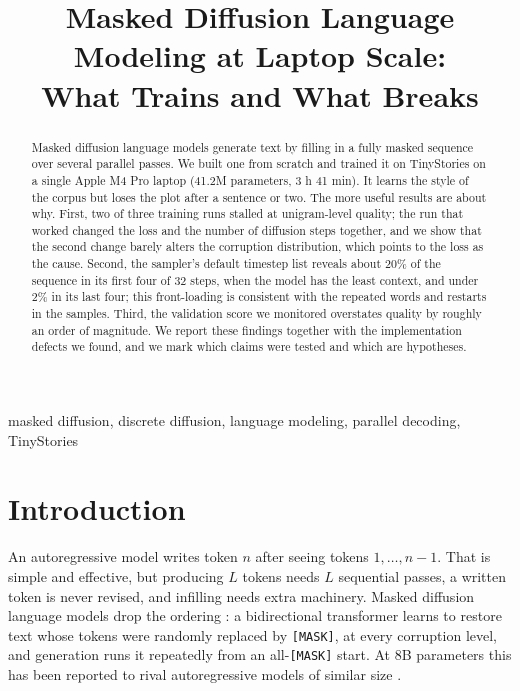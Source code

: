 \documentclass[conference]{IEEEtran}
\newcommand{\mask}{\texttt{[MASK]}}
\begin{document}
\title{Masked Diffusion Language Modeling at Laptop Scale:\\What Trains and What Breaks}

\author{
}

\maketitle

\begin{abstract}
Masked diffusion language models generate text by filling in a fully masked
sequence over several parallel passes. We built one from scratch and trained
it on TinyStories on a single Apple M4 Pro laptop (41.2M parameters, 3 h 41 min).
It learns the style of the corpus but loses the plot after a sentence or two.
The more useful results are about why. First, two of three training runs stalled
at unigram-level quality; the run that worked changed the loss and the number
of diffusion steps together, and we show that the second change barely alters
the corruption distribution, which points to the loss as the cause. Second, the
sampler's default timestep list reveals about 20\% of the sequence in its first
four of 32 steps, when the model has the least context, and under 2\% in its
last four; this front-loading is consistent with the repeated words and
restarts in the samples. Third, the validation score we monitored overstates
quality by roughly an order of magnitude. We report these findings together
with the implementation defects we found, and we mark which claims were tested
and which are hypotheses.
\end{abstract}

\begin{IEEEkeywords}
masked diffusion, discrete diffusion, language modeling, parallel decoding,
TinyStories
\end{IEEEkeywords}

\section{Introduction}

An autoregressive model writes token $n$ after seeing tokens $1,\dots,n-1$.
That is simple and effective, but producing $L$ tokens needs $L$ sequential
passes, a written token is never revised, and infilling needs extra machinery.
Masked diffusion language models drop the ordering
\cite{austin2021d3pm,sahoo2024mdlm,lou2024sedd}: a bidirectional transformer
learns to restore text whose tokens were randomly replaced by \mask{}, at every
corruption level, and generation runs it repeatedly from an all-\mask{} start.
At 8B parameters this has been reported to rival autoregressive models of
similar size \cite{nie2025llada}.
\end{document}
